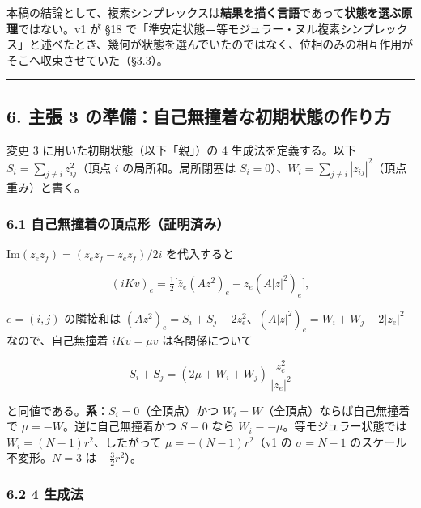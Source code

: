 \documentclass[
  10pt,
  a4paper,
]{ltjsarticle}
\begin{document}
本稿の結論として、複素シンプレックスは\textbf{結果を描く言語}であって\textbf{状態を選ぶ原理}ではない。v1
が §18
で「準安定状態＝等モジュラー・ヌル複素シンプレックス」と述べたとき、幾何が状態を選んでいたのではなく、位相のみの相互作用がそこへ収束させていた（§3.3）。

\begin{center}\rule{0.5\linewidth}{0.5pt}\end{center}

\subsection{6. 主張 3
の準備：自己無撞着な初期状態の作り方}\label{ux4e3bux5f35-3-ux306eux6e96ux5099ux81eaux5df1ux7121ux649eux7740ux306aux521dux671fux72b6ux614bux306eux4f5cux308aux65b9}

変更 3 に用いた初期状態（以下「親」）の 4 生成法を定義する。以下
\(S_i=\sum_{j\ne i}z_{ij}^2\)（頂点 \(i\) の局所和。局所閉塞は
\(S_i=0\)）、\(W_i=\sum_{j\ne i}|z_{ij}|^2\)（頂点重み）と書く。

\subsubsection{6.1
自己無撞着の頂点形（証明済み）}\label{ux81eaux5df1ux7121ux649eux7740ux306eux9802ux70b9ux5f62ux8a3cux660eux6e08ux307f}

\(\mathrm{Im}(\bar z_ez_f)=(\bar z_ez_f-z_e\bar z_f)/2i\) を代入すると

\[
(iKv)_e=\tfrac12\bigl[\bar z_e(Az^2)_e-z_e(A|z|^2)_e\bigr],
\]

\(e=(i,j)\) の隣接和は
\((Az^2)_e=S_i+S_j-2z_e^2\)、\((A|z|^2)_e=W_i+W_j-2|z_e|^2\)
なので、自己無撞着 \(iKv=\mu v\) は各関係について

\[
S_i+S_j=(2\mu+W_i+W_j)\,\frac{z_e^2}{|z_e|^2}
\]

と同値である。\textbf{系}：\(S_i=0\)（全頂点）かつ
\(W_i=W\)（全頂点）ならば自己無撞着で \(\mu=-W\)。逆に自己無撞着かつ
\(S\equiv0\) なら \(W_i\equiv-\mu\)。等モジュラー状態では
\(W_i=(N-1)r^2\)、したがって \(\mu=-(N-1)r^2\)（v1 の \(\sigma=N-1\)
のスケール不変形。\(N=3\) は \(-\tfrac32 r^2\)）。

\subsubsection{6.2 4 生成法}\label{ux751fux6210ux6cd5}
\end{document}
